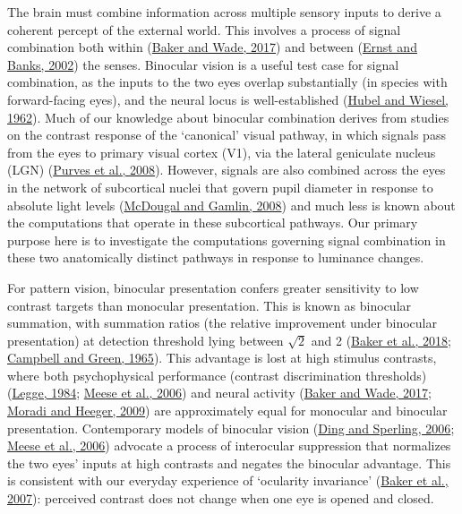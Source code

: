 \documentclass[
]{article}
\begin{document}
The brain must combine information across multiple sensory inputs to derive a coherent percept of the external world. This involves a process of signal combination both within (\protect\hyperlink{ref-Baker2017}{Baker and Wade, 2017}) and between (\protect\hyperlink{ref-Ernst2002}{Ernst and Banks, 2002}) the senses. Binocular vision is a useful test case for signal combination, as the inputs to the two eyes overlap substantially (in species with forward-facing eyes), and the neural locus is well-established (\protect\hyperlink{ref-Hubel1962}{Hubel and Wiesel, 1962}). Much of our knowledge about binocular combination derives from studies on the contrast response of the `canonical' visual pathway, in which signals pass from the eyes to primary visual cortex (V1), via the lateral geniculate nucleus (LGN) (\protect\hyperlink{ref-Purves2008}{Purves et al., 2008}). However, signals are also combined across the eyes in the network of subcortical nuclei that govern pupil diameter in response to absolute light levels (\protect\hyperlink{ref-McDougal2008}{McDougal and Gamlin, 2008}) and much less is known about the computations that operate in these subcortical pathways. Our primary purpose here is to investigate the computations governing signal combination in these two anatomically distinct pathways in response to luminance changes.

For pattern vision, binocular presentation confers greater sensitivity to low contrast targets than monocular presentation. This is known as binocular summation, with summation ratios (the relative improvement under binocular presentation) at detection threshold lying between \(\sqrt{2}\) and 2 (\protect\hyperlink{ref-Baker2018}{Baker et al., 2018}; \protect\hyperlink{ref-Campbell1965}{Campbell and Green, 1965}). This advantage is lost at high stimulus contrasts, where both psychophysical performance (contrast discrimination thresholds) (\protect\hyperlink{ref-Legge1984}{Legge, 1984}; \protect\hyperlink{ref-Meese2006}{Meese et al., 2006}) and neural activity (\protect\hyperlink{ref-Baker2017}{Baker and Wade, 2017}; \protect\hyperlink{ref-Moradi2009}{Moradi and Heeger, 2009}) are approximately equal for monocular and binocular presentation. Contemporary models of binocular vision (\protect\hyperlink{ref-Ding2006}{Ding and Sperling, 2006}; \protect\hyperlink{ref-Meese2006}{Meese et al., 2006}) advocate a process of interocular suppression that normalizes the two eyes' inputs at high contrasts and negates the binocular advantage. This is consistent with our everyday experience of `ocularity invariance' (\protect\hyperlink{ref-Baker2007}{Baker et al., 2007}): perceived contrast does not change when one eye is opened and closed.
\end{document}
